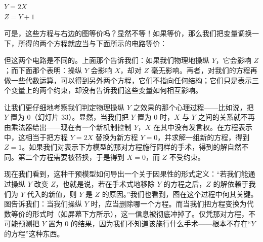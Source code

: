 \begin{center}
\begin{minipage}{0.30\textwidth}
\centering
$Y = 2X$\\[4pt]
$Z = Y + 1$
\end{minipage}%
\begin{minipage}{0.62\textwidth}
\centering
{}
\end{minipage}
\end{center}

可是，这些方程与右边的图等价吗？显然不等！如果等价，那么我们把变量调换一下，所得的两个方程就应当与下面所示的电路等价：

\begin{center}
\end{center}

但这两个电路是不同的。上面那个告诉我们：如果我们物理地操纵 $Y$，它会影响 $Z$；而下面那个表明：操纵 $Y$ 会影响 $X$，却对 $Z$ 毫无影响。再者，对我们的方程再做一些代数运算，可以得到另外两个方程，它们不指向任何结构；它们只是表示三个变量上的两个约束，却没有告诉我们这些变量如何相互影响。

让我们更仔细地考察我们判定物理操纵 $Y$ 之效果的那个心理过程——比如说，把 $Y$ 置为 $0$（幻灯片 33）。显然，当我们把 $Y$ 置为 $0$ 时，$X$ 与 $Y$ 之间的关系就不再由乘法器给出——现在有一个新机制控制 $Y$，$X$ 在其中没有发言权。在方程表示中，这相当于把方程 $Y = 2X$ 替换为新方程 $Y = 0$，并求解一组新的方程，得到 $Z = 1$。如果我们对表示下方模型的那对方程施行同样的手术，得到的解自然不同。第二个方程需要被替换，于是得到 $X = 0$，而 $Z$ 不受约束。

现在我们看到，这种干预模型如何导出一个关于因果性的形式定义：“若我们能通过操纵 $Y$ 改变 $Z$，也就是说，若在手术式地移除 $Y$ 的方程之后，$Z$ 的解依赖于我们为 $Y$ 代入的新值，则 $Y$ 是 $Z$ 的原因。”我们也看到，图在这个过程中何其关键。图告诉我们：当我们操纵 $Y$ 时，应当删除哪一个方程。而当我们把方程变换为代数等价的形式时（如屏幕下方所示），这一信息被彻底冲掉了。仅凭那对方程，不可能预测把 $Y$ 置为 $0$ 的结果，因为我们不知道该施行什么手术——根本不存在“$Y$ 的方程”这种东西。

